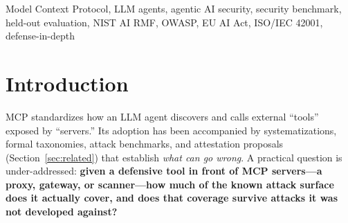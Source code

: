 \documentclass[conference]{IEEEtran}
\begin{document}
\begin{IEEEkeywords}
Model Context Protocol, LLM agents, agentic AI security, security benchmark, held-out evaluation, NIST AI RMF, OWASP, EU AI Act, ISO/IEC 42001, defense-in-depth
\end{IEEEkeywords}

\section{Introduction}
MCP standardizes how an LLM agent discovers and calls external ``tools'' exposed by ``servers.'' Its adoption has been accompanied by systematizations, formal taxonomies, attack benchmarks, and attestation proposals (Section~\ref{sec:related}) that establish \emph{what can go wrong}. A practical question is under-addressed: \textbf{given a defensive tool in front of MCP servers---a proxy, gateway, or scanner---how much of the known attack surface does it actually cover, and does that coverage survive attacks it was not developed against?}
\end{document}
